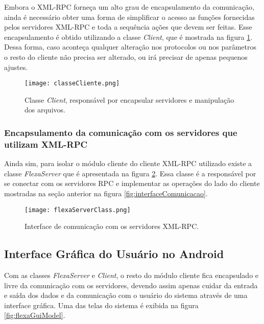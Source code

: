         Embora o XML-RPC forneça um alto grau de encapsulamento da comunicação, ainda é necessário obter uma forma de simplificar o acesso as funções fornecidas pelos servidores XML-RPC e toda a sequência ações que devem ser feitas. Esse encapsulamento é obtido utilizando a classe \textit{Client}, que é mostrada na figura \ref{fig:clientClass}. Dessa forma, caso aconteça qualquer alteração nos protocolos ou nos parâmetros o resto do cliente não precisa ser alterado, ou irá precisar de apenas pequenos ajustes.
        
        \begin{figure}[!ht]
        \centering
        \texttt{[image: classeCliente.png]}
        \caption{Classe \textit{Client}, responsável por encapsular servidores e manipulação dos arquivos.}
        \label{fig:clientClass}
        \end{figure}
        
        
         \subsubsection{Encapsulamento da comunicação com os servidores que utilizam XML-RPC}
         
        Ainda sim, para isolar o módulo cliente do cliente XML-RPC utilizado existe a classe \textit{FlexaServer} que é apresentada na figura \ref{fig:flexaServer}. Essa classe é a responsável por se conectar com os servidores RPC e implementar as operações  do lado do cliente mostradas na seção anterior na figura \ref{fig:interfaceComunicacao}.
        
        \begin{figure}[!ht]
        \centering
        \texttt{[image: flexaServerClass.png]}
        \caption{Interface de comunicação com os servidores XML-RPC.}
        \label{fig:flexaServer}
        \end{figure}
        
        
        \subsection{Interface Gráfica do Usuário no Android}
        
        Com as classes \textit{FlexaServer} e \textit{Client}, o resto do módulo cliente fica encapsulado e livre da comunicação com os servidores, devendo assim apenas cuidar da entrada e saída dos dados e da comunicação com o usuário do sistema através de uma interface gráfica. Uma das telas do sistema é exibida na figura \ref{fig:flexaGuiModel}.
        
